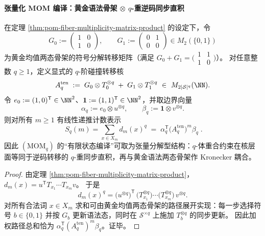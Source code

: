 \paragraph{张量化 MOM 编译：黄金语法骨架 \texorpdfstring{$\otimes$}{x} \(q\)-重逆码同步直积}
\begin{proposition}\label{prop:pom-momq-tensor-kernel-construction}
在定理 \ref{thm:pom-fiber-multiplicity-matrix-product} 的设定下，令
\[
G_0:=\begin{pmatrix}1&0\\[2pt]1&0\end{pmatrix},
\qquad
G_1:=\begin{pmatrix}0&1\\[2pt]0&0\end{pmatrix}
\in M_2(\{0,1\})
\]
为黄金均值两态骨架的符号分解转移矩阵（满足 \(G_0+G_1=\bigl(\begin{smallmatrix}1&1\\1&0\end{smallmatrix}\bigr)\)）。
对任意整数 \(q\ge 1\)，定义显式的 \(q\)-阶碰撞转移核
\[
A_q^{\mathrm{ten}}
\;:=\;
G_0\otimes T_0^{\otimes q}\;+\;G_1\otimes T_1^{\otimes q}
\ \in\ M_{2|\mathcal S|^q}(\NN).
\]
令 \(e_0:=(1,0)^{\mathsf T}\in\NN^2\)、\(\mathbf 1:=(1,1)^{\mathsf T}\in\NN^2\)，并取边界向量
\[
\alpha_q:=e_0\otimes u^{\otimes q},
\qquad
\beta_q:=\mathbf 1\otimes v^{\otimes q}.
\]
则对所有 \(m\ge 1\) 有线性递推计数表示
\[
\boxed{\;
S_q(m)=\sum_{x\in X_m}d_m(x)^q
\;=\;
\alpha_q^{\mathsf T}\bigl(A_q^{\mathrm{ten}}\bigr)^{m}\beta_q\; }.
\]
因此 \((\mathrm{MOM}_q)\) 的“有限状态编译”可取为张量分解型结构：\(q\)-体重合约束在核层面等同于逆码转移的 \(q\)-重同步直积，再与黄金语法两态骨架作 Kronecker 耦合。
\end{proposition}
\begin{proof}
由定理 \ref{thm:pom-fiber-multiplicity-matrix-product}，
\(
d_m(x)=u^{\mathsf T}T_{x_1}\cdots T_{x_m}v
\)。
于是
\[
d_m(x)^q
=
\bigl(u^{\otimes q}\bigr)^{\mathsf T}\,
\bigl(T_{x_1}^{\otimes q}\bigr)\cdots
\bigl(T_{x_m}^{\otimes q}\bigr)\,
v^{\otimes q}.
\]
对所有合法词 \(x\in X_m\) 求和可由黄金均值两态骨架的路径展开实现：每一步选择符号 \(b\in\{0,1\}\) 并按 \(G_b\) 更新语法态，同时在 \(\mathcal S^{\times q}\) 上施加 \(T_b^{\otimes q}\) 的同步更新。
因此加权路径总和恰为 \(\alpha_q^{\mathsf T}(A_q^{\mathrm{ten}})^m\beta_q\)。证毕。
\end{proof}




